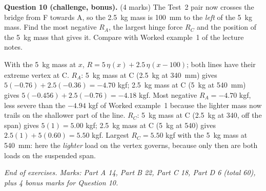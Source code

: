 \documentclass[11pt,a4paper]{article}
\newcommand{\il}[1]{\eta_{#1}}
\newif\ifkey \keyfalse \ifdefined\showkey\keytrue\fi
\newcommand{\qmarks}[1]{ {\small(#1 marks)}}
\newcommand{\workspace}[1]{\ifkey\else\vspace{#1}\fi}
\begin{document}
\textbf{Question 10 (challenge, bonus).}\qmarks{4} The Test~2 pair now crosses the bridge from F towards A, so the \SI{2.5}{kg} mass is \SI{100}{mm} to the \emph{left} of the \SI{5}{kg} mass. Find the most negative $R_A$, the largest hinge force $R_C$ and the position of the \SI{5}{kg} mass that gives it. Compare with Worked example~1 of the lecture notes.
\workspace{3cm}
\begin{answer}
With the 5~kg mass at $x$, $R = 5\,\il{}(x) + 2.5\,\il{}(x-100)$; both lines have their extreme vertex at C. $R_A$: 5~kg mass at C (2.5~kg at \SI{340}{mm}) gives $5(-0.76) + 2.5(-0.36) = -4.70$ kgf; 2.5~kg mass at C (5~kg at \SI{540}{mm}) gives $5(-0.456) + 2.5(-0.76) = -4.18$ kgf. Most negative $R_A = -4.70$ kgf, less severe than the $-4.94$ kgf of Worked example~1 because the lighter mass now trails on the shallower part of the line. $R_C$: 5~kg mass at C (2.5~kg at 340, off the span) gives $5(1) = 5.00$ kgf; 2.5~kg mass at C (5~kg at 540) gives $2.5(1) + 5(0.60) = 5.50$ kgf. Largest $R_C = 5.50$ kgf with the 5~kg mass at \SI{540}{mm}: here the \emph{lighter} load on the vertex governs, because only then are both loads on the suspended span.
\end{answer}

\vfill
{\small\textit{End of exercises. Marks: Part A 14, Part B 22, Part C 18, Part D 6 (total 60), plus 4 bonus marks for Question 10.}}
\end{document}
